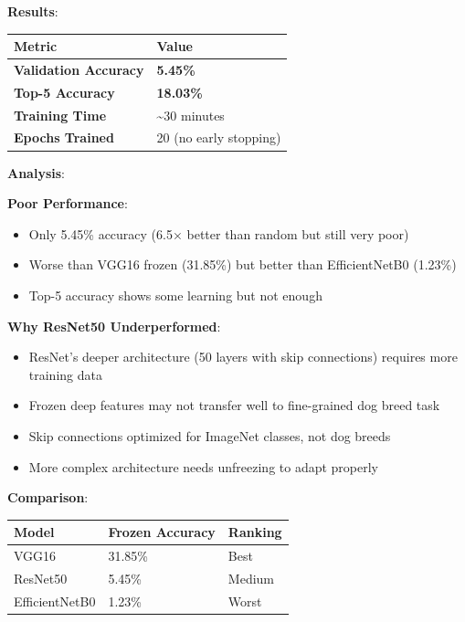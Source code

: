 \documentclass[
  letterpaper,
  DIV=11,
  numbers=noendperiod]{scrartcl}
\providecommand{\tightlist}{%
  \setlength{\itemsep}{0pt}\setlength{\parskip}{0pt}}
\begin{document}
\textbf{Results}:

\begin{longtable}[]{@{}ll@{}}
\toprule\noalign{}
Metric & Value \\
\midrule\noalign{}
\endhead
\bottomrule\noalign{}
\endlastfoot
\textbf{Validation Accuracy} & \textbf{5.45\%} \\
\textbf{Top-5 Accuracy} & \textbf{18.03\%} \\
\textbf{Training Time} & \textasciitilde30 minutes \\
\textbf{Epochs Trained} & 20 (no early stopping) \\
\end{longtable}

\textbf{Analysis}:

\textbf{Poor Performance}:

\begin{itemize}
\tightlist
\item
  Only 5.45\% accuracy (6.5× better than random but still very poor)
\item
  Worse than VGG16 frozen (31.85\%) but better than EfficientNetB0
  (1.23\%)
\item
  Top-5 accuracy shows some learning but not enough
\end{itemize}

\textbf{Why ResNet50 Underperformed}:

\begin{itemize}
\tightlist
\item
  ResNet's deeper architecture (50 layers with skip connections)
  requires more training data
\item
  Frozen deep features may not transfer well to fine-grained dog breed
  task
\item
  Skip connections optimized for ImageNet classes, not dog breeds
\item
  More complex architecture needs unfreezing to adapt properly
\end{itemize}

\textbf{Comparison}:

\begin{longtable}[]{@{}lll@{}}
\toprule\noalign{}
Model & Frozen Accuracy & Ranking \\
\midrule\noalign{}
\endhead
\bottomrule\noalign{}
\endlastfoot
VGG16 & 31.85\% & Best \\
ResNet50 & 5.45\% & Medium \\
EfficientNetB0 & 1.23\% & Worst \\
\end{longtable}
\end{document}
